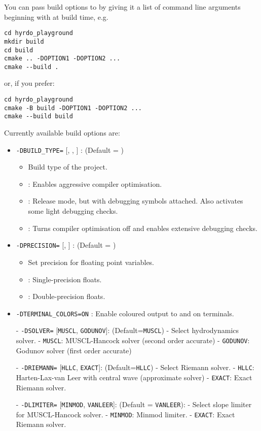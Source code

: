 You can pass build options to \cmake by giving it a list of command line
arguments beginning with  at build time, e.g.

\begin{lstlisting}
cd hyrdo_playground
mkdir build
cd build
cmake .. -DOPTION1 -DOPTION2 ...
cmake --build .
\end{lstlisting}

or, if you prefer:

\begin{lstlisting}
cd hyrdo_playground
cmake -B build -DOPTION1 -DOPTION2 ...
cmake --build build
\end{lstlisting}


Currently available build options are:

\begin{itemize}
\item \verb|-DBUILD_TYPE=| [, , ] :
    (Default = )
    \begin{itemize}
        \item Build type of the project.
        \item {}: Enables aggressive compiler optimisation.
        \item {}: Release mode, but with debugging symbols
                attached. Also activates some light debugging checks.
        \item {}: Turns compiler optimisation off and enables
                extensive debugging checks.
    \end{itemize}

\item \verb|-DPRECISION=| [, ] :
    (Default = )
    \begin{itemize}
        \item Set precision for floating point variables.
        \item {}: Single-precision floats.
        \item {}: Double-precision floats.
    \end{itemize}

\item \verb|-DTERMINAL_COLORS=ON| :
    Enable coloured output to  and  on terminals.


- \verb|-DSOLVER=| [\verb|MUSCL|, \verb|GODUNOV|]: (Default=\verb|MUSCL|)
  - Select hydrodynamics solver.
  - \verb|MUSCL|: MUSCL-Hancock solver (second order accurate)
  - \verb|GODUNOV|: Godunov solver (first order accurate)

- \verb|-DRIEMANN=| [\verb|HLLC|, \verb|EXACT|]: (Default=\verb|HLLC|)
  - Select Riemann solver.
  - \verb|HLLC|: Harten-Lax-van Leer with central wave (approximate solver)
  - \verb|EXACT|: Exact Riemann solver.

- \verb|-DLIMITER=| [\verb|MINMOD|, \verb|VANLEER|]: (Default = \verb|VANLEER|):
  - Select slope limiter for MUSCL-Hancock solver.
  - \verb|MINMOD|: Minmod limiter.
  - \verb|EXACT|: Exact Riemann solver.



\end{itemize}
